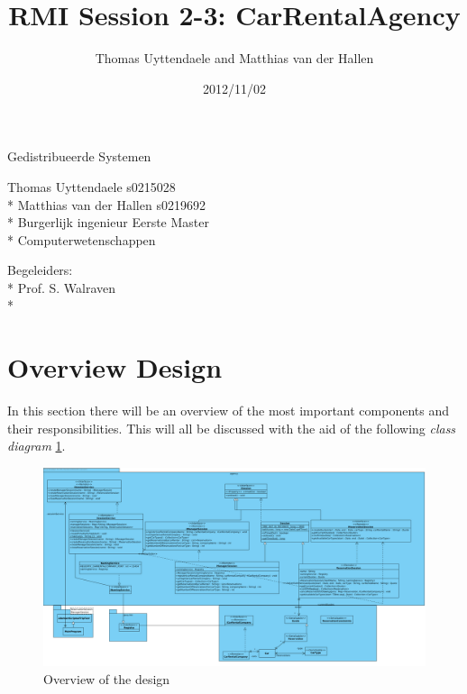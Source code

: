 \documentclass[a4paper]{article}
\title{RMI Session 2-3: CarRentalAgency}
\author{Thomas Uyttendaele and Matthias van der Hallen}
\date{2012/11/02}
\begin{document}
\begin{titlepage}

\pagestyle{plain}

\begin{center}
	{\Large Gedistribueerde Systemen}
	
	\vspace{3cm}

	{\Huge \textbf{\thetitle}}
	
	\vspace{5cm}

	{\Large	Thomas Uyttendaele s0215028 \\* Matthias van der Hallen s0219692\\* Burgerlijk ingenieur Eerste Master \\* Computerwetenschappen}
\end{center}

\vspace{8cm}

\begin{center}
	{\Large Begeleiders:\\*
	Prof. S. Walraven\\*}
\end{center}

\vspace{2cm}

\begin{center}
	{\Large \thedate}
\end{center}
 
\end{titlepage}
\renewcommand{\contentsname}{Inhoudstafel}
\tableofcontents
\newpage
\section{Overview Design}
In this section there will be an overview of the most important components and their responsibilities. 
This will all be discussed with the aid of the following \emph{class diagram} \ref{fig:classdiagram}. 
\begin{figure}[hbtp]
\centering
\includegraphics[width=\textwidth]{img/RMI 2-3.png}
\caption{Overview of the design}
\label{fig:classdiagram}
\end{figure}
\end{document}
